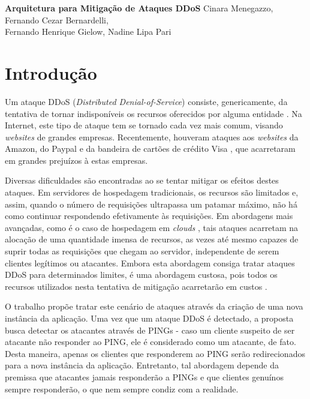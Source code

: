 \documentclass[a4paper, 11pt]{article}
\begin{document}
{
\begin{center}
{\LARGE \textbf{Arquitetura para Mitiga\c{c}\~{a}o de Ataques DDoS}}
\vskip 0.5cm
{\Large Cinara Menegazzo, Fernando Cezar Bernardelli, \\ Fernando Henrique Gielow, Nadine
Lipa Pari}
\end{center}
}

\section{Introdu\c{c}\~{a}o}

Um ataque DDoS (\emph{Distributed Denial-of-Service})
 consiste, genericamente, da tentativa de tornar indisponíveis
os recursos oferecidos por alguma entidade \cite{Zhang:11}. Na Internet, este
tipo de ataque tem se tornado cada vez mais comum, visando \emph{websites} de
grandes empresas. Recentemente, houveram ataques aos \emph{websites} da Amazon,
do Paypal e da bandeira de cartões de crédito Visa \cite{Zuckerman:10,ddosatks},
que
acarretaram em grandes prejuízos à estas empresas.

Diversas dificuldades são encontradas ao se tentar mitigar os efeitos destes
ataques. Em servidores de hospedagem tradicionais, os recursos são limitados e,
assim, quando o número de requisições ultrapassa um patamar máximo, não há como
continuar respondendo efetivamente às requisições. Em abordagens mais avançadas,
como é o caso de hospedagem em \emph{clouds} \cite{Zhang:10}, tais ataques
acarretam na alocação de uma quantidade imensa de recursos, as vezes até mesmo
capazes de
suprir todas as requisições que chegam ao servidor, independente de serem
clientes legítimos ou atacantes. Embora esta abordagem consiga tratar ataques
DDoS para determinados limites, é uma abordagem custosa, pois todos os recursos
utilizados nesta tentativa de mitigação acarretar\~ao em custos
\cite{Soon:10}.

O trabalho \cite{Bakshi:10} prop\~oe tratar este cen\'ario de ataques através da
criação de uma nova instância da aplicação. Uma vez que um ataque DDoS é
detectado, a proposta busca detectar os atacantes através de PINGs -
caso um cliente suspeito de ser atacante não responder ao PING, ele é
considerado como um
atacante, de fato. Desta maneira, apenas os clientes que responderem ao PING
serão
redirecionados para a nova instância da aplicação. Entretanto, tal abordagem
depende da premissa que atacantes jamais responderão a PINGs e que clientes
genuínos sempre responderão, o que nem sempre condiz com a realidade.
\end{document}
